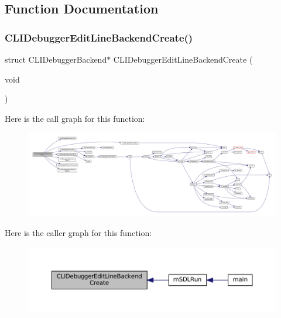 \subsection{Function Documentation}
\mbox{\label{cli-el-backend_8h_aea9ca36da1b56d3b608e61aba06b9044}} 
\subsubsection{\texorpdfstring{C\+L\+I\+Debugger\+Edit\+Line\+Backend\+Create()}{CLIDebuggerEditLineBackendCreate()}}
{\footnotesize\ttfamily struct C\+L\+I\+Debugger\+Backend$\ast$ C\+L\+I\+Debugger\+Edit\+Line\+Backend\+Create (\begin{DoxyParamCaption}\item[{void}]{ }\end{DoxyParamCaption})}

Here is the call graph for this function\+:
\nopagebreak
\begin{figure}[H]
\begin{center}
\leavevmode
\includegraphics[width=350pt]{cli-el-backend_8h_aea9ca36da1b56d3b608e61aba06b9044_cgraph}
\end{center}
\end{figure}
Here is the caller graph for this function\+:
\nopagebreak
\begin{figure}[H]
\begin{center}
\leavevmode
\includegraphics[width=350pt]{cli-el-backend_8h_aea9ca36da1b56d3b608e61aba06b9044_icgraph}
\end{center}
\end{figure}
